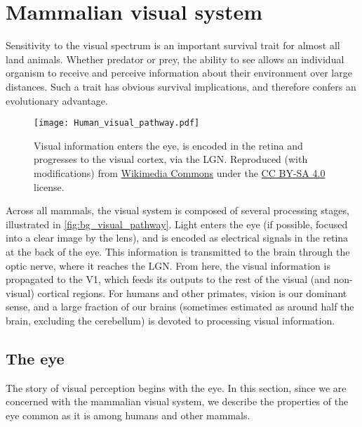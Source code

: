 \section{Mammalian visual system}
\label{sec:bg_visual_system}

Sensitivity to the visual spectrum is an important survival trait for almost all land animals.
Whether predator or prey, the ability to see allows an individual organism to receive and perceive information about their environment over large distances.
Such a trait has obvious survival implications, and therefore confers an evolutionary advantage.

\begin{figure}[htbp]
\centering
\texttt{[image: Human\_visual\_pathway.pdf]}
\caption{%
Visual information enters the eye, is encoded in the retina and progresses to the visual cortex, via the \ac{LGN}.
Reproduced (with modifications) from \href{https://commons.wikimedia.org/wiki/File:Human_visual_pathway.svg}{Wikimedia Commons} under the \href{https://creativecommons.org/licenses/by-sa/4.0/deed.en}{CC BY-SA 4.0} license.
}
\label{fig:bg_visual_pathway}
\end{figure}

Across all mammals, the visual system is composed of several processing stages, illustrated in \autoref{fig:bg_visual_pathway}.
Light enters the eye (if possible, focused into a clear image by the lens), and is encoded as electrical signals in the retina at the back of the eye.
This information is transmitted to the brain through the optic nerve, where it reaches the \ac{LGN}.
From here, the visual information is propagated to the \acf{V1}, which feeds its outputs to the rest of the visual (and non-visual) cortical regions.
For humans and other primates, vision is our dominant sense, and a large fraction of our brains (sometimes estimated as around half the brain, excluding the cerebellum) is devoted to processing visual information.


\subsection{The eye}

The story of visual perception begins with the eye.
In this section, since we are concerned with the mammalian visual system, we describe the properties of the eye common as it is among humans and other mammals.


